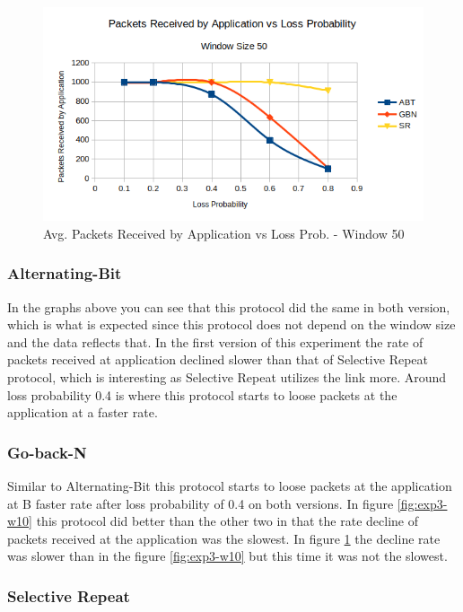\documentclass[10pt, a4paper]{article}
\begin{document}
    \begin{figure}[H]
        \includegraphics[width=\textwidth]{exp3-w50.png}
        \centering
        \caption{Avg. Packets Received by Application vs Loss Prob. - Window 50 }
        \label{fig:exp3-w50}
    \end{figure}
	
    \subsubsection{Alternating-Bit}
    	
    	In the graphs above you can see that this protocol did the same in both version, which is what is expected since this protocol does not depend on the window size and the data reflects that. In the first version of this experiment the rate of packets received at application declined slower than that of Selective Repeat protocol, which is interesting as Selective Repeat utilizes the link more. Around loss probability 0.4 is where this protocol starts to loose packets at the application at a faster rate.
    
    \subsubsection{Go-back-N}
	    
	    Similar to Alternating-Bit this protocol starts to loose packets at the application at B faster rate after loss probability of 0.4 on both versions. In figure \ref{fig:exp3-w10} this protocol did better than the other two in that the rate decline of packets received at the application was the slowest. In figure \ref{fig:exp3-w50} the decline rate was slower than in the figure \ref{fig:exp3-w10} but this time it was not the slowest.
	    
    \subsubsection{Selective Repeat}
    	
\end{document}
